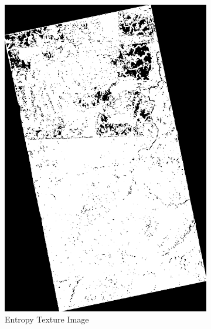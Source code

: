 \begin{figure}[H]
\begin{subfigure}[b]{0.4\linewidth}
    \includegraphics[width=\linewidth]{Chapter4/sum_and_diff_textures/entropyimage.png}
     \caption{Entropy Texture Image}
  \end{subfigure}
  \centering
  \begin{subfigure}[b]{0.4\linewidth}

\end{subfigure}
\end{figure}
